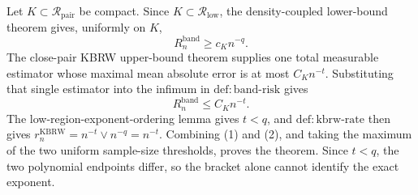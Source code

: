 Let \(K\subset\mathcal R_{\mathrm{pair}}\) be compact.  Since
\(K\subset\mathcal R_{\mathrm{low}}\), the density-coupled lower-bound
theorem gives, uniformly on \(K\),
\[
R_n^{\mathrm{band}}\geq c_K n^{-q}.
\tag{1}
\]
The close-pair KBRW upper-bound theorem supplies one total measurable
estimator whose maximal mean absolute error is at most \(C_Kn^{-t}\).
Substituting that single estimator into the infimum in
\(\mathrm{def:band\mbox{-}risk}\) gives
\[
R_n^{\mathrm{band}}\leq C_Kn^{-t}.
\tag{2}
\]
The low-region-exponent-ordering lemma gives \(t<q\), and
\(\mathrm{def:kbrw\mbox{-}rate}\) then gives
\(r_n^{\mathrm{KBRW}}=n^{-t}\vee n^{-q}=n^{-t}\).  Combining (1) and
(2), and taking the maximum of the two uniform sample-size thresholds, proves
the theorem.  Since \(t<q\), the two polynomial endpoints differ, so the
bracket alone cannot identify the exact exponent.